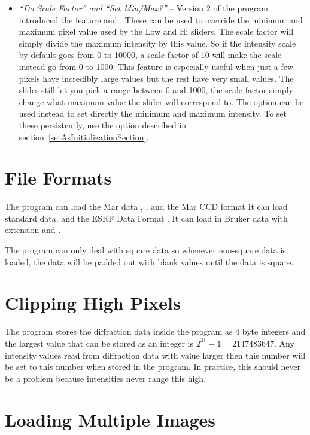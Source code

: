 \begin{itemize}
    \item {\em ``Do Scale Factor'' and ``Set Min/Max?''} -- Version
    2 of the program introduced the feature 
    and . These can be used to override the minimum
    and maximum pixel value used by the Low and Hi sliders. The scale
    factor will simply divide the maximum intensity by this value.
    So if the intensity scale by default goes from 0 to 10000, a
    scale factor of 10 will make the scale instead go from 0 to 1000.
    This feature is especially useful when just a few pixels have
    incredibly large values but the rest have very small values.
    The slides still let you pick a range between 0 and 1000, the
    scale factor simply change what maximum value the slider will
    correspond to. The  option can be used instead
    to set directly the minimum and maximum intensity. To set these
    persistently, use the  option described
    in section~\ref{setAsInitializationSection}.
\end{itemize}

\section{File Formats}

The program can load the Mar data , 
, and the  Mar CCD format
It can load standard  data. 
and the ESRF Data Format .
It can load in Bruker data with extension 
 and .


The program can only deal with square data so whenever non-square
data is loaded, the data will be padded out with blank values
until the data is square.

\section{Clipping High Pixels}

The program stores the diffraction data inside the program as 4 byte integers and 
the largest value that can be stored as an integer is $2^{31}-1 = 2147483647$.
Any intensity values read from diffraction data with value larger then 
this number will be set to this number when stored in the program. In practice, 
this should never be a problem because intensities never range this high.

\section{Loading Multiple Images}

